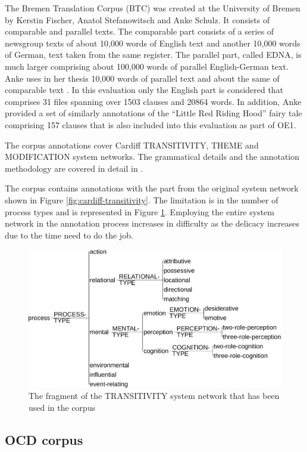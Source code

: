     The Bremen Translation Corpus (BTC) was created at the University of Bremen by Kerstin Fischer, Anatol Stefanowitsch and Anke Schulz. It consists of comparable and parallel texts. The comparable part consists of a series of newsgroup texts of about 10,000 words of English text and another 10,000 words of German, text taken from the same register. The parallel part, called EDNA, is much larger comprising about 100,000 words of parallel English-German text. Anke uses in her thesis 10,000 words of parallel text and about the same of comparable text \citep[31]{schulz2015me}. In this evaluation only the English part is considered that comprises 31 files spanning over 1503 clauses and 20864 words. In addition, Anke provided a set of similarly annotations of the ``Little Red Riding Hood'' fairy tale comprising 157 clauses that is also included into this evaluation as part of OE1. 
    
    The corpus annotations cover Cardiff TRANSITIVITY, THEME and MODIFICATION system networks. The grammatical details and the annotation methodology are covered in detail in \citet{schulz2015me}.
    
    
    The corpus contains annotations with the part from the original system network shown in Figure \ref{fig:cardiff-transitivity}. The limitation is in the number of process types and is represented in Figure \ref{fig:transitivity-simplified}. Employing the entire system network in the annotation process increases in difficulty as the delicacy increases due to the time need to do the job. 

    \begin{figure}[!ht]
        \centering
        \includegraphics[width=.65\textwidth]{Figures/Evaluation/trans-simplified.pdf}
        \caption{The fragment of the TRANSITIVITY system network that has been used in the corpus}
        \label{fig:transitivity-simplified}
    \end{figure}
    

\subsection{OCD corpus}

